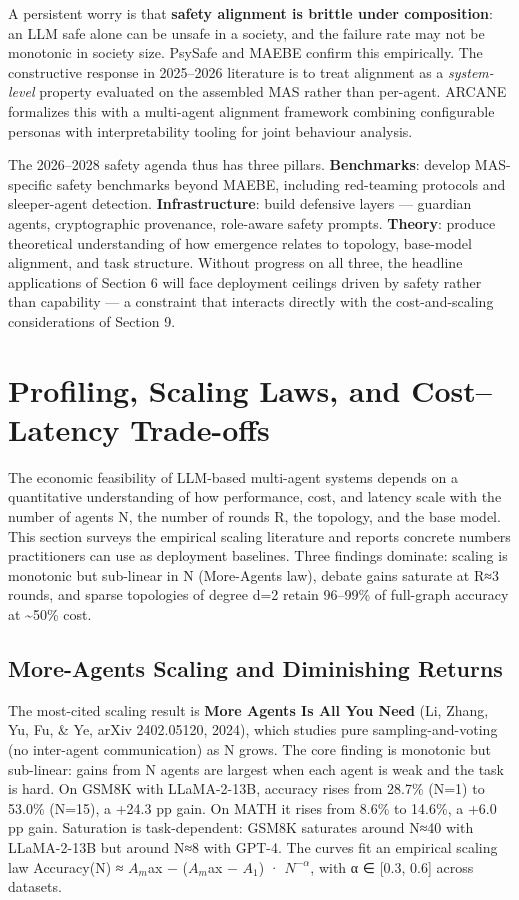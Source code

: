 A persistent worry is that \textbf{safety alignment is brittle under composition}: an LLM safe alone can be unsafe in a society, and the failure rate may not be monotonic in society size. PsySafe and MAEBE confirm this empirically. The constructive response in 2025--2026 literature is to treat alignment as a \emph{system-level} property evaluated on the assembled MAS rather than per-agent. ARCANE formalizes this with a multi-agent alignment framework combining configurable personas with interpretability tooling for joint behaviour analysis.

The 2026--2028 safety agenda thus has three pillars. \textbf{Benchmarks}: develop MAS-specific safety benchmarks beyond MAEBE, including red-teaming protocols and sleeper-agent detection. \textbf{Infrastructure}: build defensive layers --- guardian agents, cryptographic provenance, role-aware safety prompts. \textbf{Theory}: produce theoretical understanding of how emergence relates to topology, base-model alignment, and task structure. Without progress on all three, the headline applications of Section 6 will face deployment ceilings driven by safety rather than capability --- a constraint that interacts directly with the cost-and-scaling considerations of Section 9.

\section{Profiling, Scaling Laws, and Cost--Latency Trade-offs}\label{profiling-scaling-laws-and-costlatency-trade-offs}

The economic feasibility of LLM-based multi-agent systems depends on a quantitative understanding of how performance, cost, and latency scale with the number of agents N, the number of rounds R, the topology, and the base model. This section surveys the empirical scaling literature and reports concrete numbers practitioners can use as deployment baselines. Three findings dominate: scaling is monotonic but sub-linear in N (More-Agents law), debate gains saturate at R≈3 rounds, and sparse topologies of degree d=2 retain 96--99\% of full-graph accuracy at \textasciitilde50\% cost.

\subsection{More-Agents Scaling and Diminishing Returns}\label{more-agents-scaling-and-diminishing-returns}

The most-cited scaling result is \textbf{More Agents Is All You Need} (Li, Zhang, Yu, Fu, \& Ye, arXiv 2402.05120, 2024), which studies pure sampling-and-voting (no inter-agent communication) as N grows. The core finding is monotonic but sub-linear: gains from N agents are largest when each agent is weak and the task is hard. On GSM8K with LLaMA-2-13B, accuracy rises from 28.7\% (N=1) to 53.0\% (N=15), a +24.3 pp gain. On MATH it rises from 8.6\% to 14.6\%, a +6.0 pp gain. Saturation is task-dependent: GSM8K saturates around N≈40 with LLaMA-2-13B but around N≈8 with GPT-4. The curves fit an empirical scaling law Accuracy(N) ≈ \(A_m\)ax − (\(A_m\)ax − \(A_1\)) · \(N^{-α}\), with α ∈ {[}0.3, 0.6{]} across datasets.

